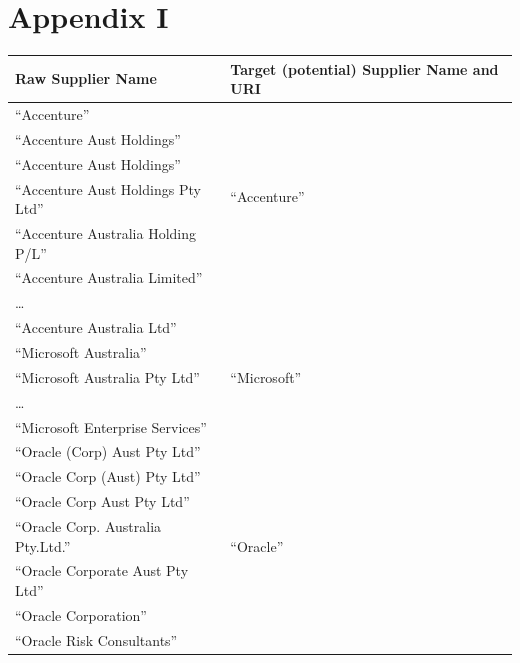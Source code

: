 \documentclass{llncs}
\begin{document}
\section*{Appendix I}
\begin{table}[!htb]
\renewcommand{\arraystretch}{1.3}
\begin{center}
\begin{tabular}{|p{7cm}|p{7cm}|}
\hline
  \textbf{Raw Supplier Name} & \textbf{Target (potential) Supplier Name and URI}  \\  \hline
  ``Accenture'' & \multirow{6}{*}{``Accenture''} \\
  ``Accenture Aust Holdings'' & \multirow{6}{*}{\scriptsize\url{http://live.dbpedia.org/resource/Accenture}} \\ 
   ``Accenture Aust Holdings'' & \\  
   ``Accenture Aust Holdings Pty Ltd'' & \\
   ``Accenture  Australia Holding P/L'' & \\
  ``Accenture Australia Limited'' & \\
  \ldots  & \\
  ``Accenture Australia Ltd'' & \\ \hline
  ``Microsoft Australia'' & \multirow{3}{*}{``Microsoft''} \\
  ``Microsoft Australia Pty Ltd'' & \multirow{3}{*}{\scriptsize\url{http://live.dbpedia.org/resource/Microsoft}} \\
  \ldots  & \\
  ``Microsoft Enterprise Services'' & \\ \hline
  ``Oracle (Corp) Aust Pty Ltd''  & \multirow{9}{*}{``Oracle''} \\
  ``Oracle Corp (Aust) Pty Ltd''  & \multirow{9}{*}{\scriptsize\url{http://live.dbpedia.org/resource/Oracle_Corporation}} \\
  ``Oracle Corp Aust Pty Ltd'' & \\
  ``Oracle Corp. Australia Pty.Ltd.'' & \\
  ``Oracle Corporate Aust Pty Ltd'' & \\
  ``Oracle Corporation'' & \\
  ``Oracle Risk Consultants'' & \\

\end{tabular}
\end{center}
\end{table}
\end{document}
